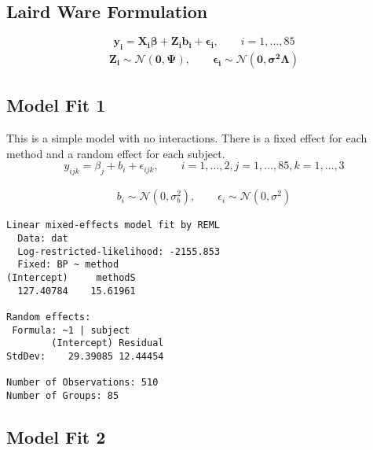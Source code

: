 \documentclass[12pt, a4paper]{article}
\begin{document}
\newpage
















\newpage


\subsection{Laird Ware Formulation}
\begin{equation*}
\boldsymbol{y_{i}} = \boldsymbol{X_{i}\beta}  + \boldsymbol{Z_{i}b_{i}} + \boldsymbol{\epsilon_{i}}, \qquad i=1,\dots,85
\end{equation*}
\begin{eqnarray*}
\boldsymbol{Z_{i}} \sim \mathcal{N}(\boldsymbol{0,\Psi}),\qquad
\boldsymbol{\epsilon_{i}} \sim \mathcal{N}(\boldsymbol{0,\sigma^2\Lambda})
\end{eqnarray*}

\newpage
\subsection{Model Fit 1}

This is a simple model with no interactions. There is a fixed effect for each method and a random effect for each subject.
\begin{equation*}
y_{ijk} = \beta_{j}  + b_{i} + \epsilon_{ijk}, \qquad i=1,\dots,2, j=1,\dots,85, k=1,\dots,3
\end{equation*}

\begin{eqnarray*}
b_{i} \sim \mathcal{N}(0,\sigma^2_{b}), \qquad \epsilon_{i} \sim \mathcal{N}(0,\sigma^2)
\end{eqnarray*}

\begin{verbatim}
Linear mixed-effects model fit by REML
  Data: dat
  Log-restricted-likelihood: -2155.853
  Fixed: BP ~ method
(Intercept)     methodS
  127.40784    15.61961

Random effects:
 Formula: ~1 | subject
        (Intercept) Residual
StdDev:    29.39085 12.44454

Number of Observations: 510
Number of Groups: 85
\end{verbatim}

\newpage
\subsection{Model Fit 2}
\end{document}
